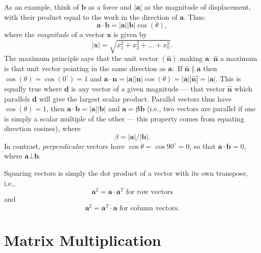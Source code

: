 As an example, think of $\mathbf b$ as a force and $|\mathbf a|$ as the magnitude of displacement, with their product equal to the work in the 
direction of $\mathbf a$. Thus:
\begin{equation}
\mathbf{a \cdot b = |a||b|} \cos (\theta),
\end{equation}	 
where the \emph{magnitude} of a vector $\mathbf x$ is given by
\begin{equation}
|\mathbf{x}| = \sqrt{x^2_1 + x ^2_2 + \ldots + x^2_n}. 
\end{equation}
The maximum principle says that the unit vector $\mathbf{(\hat{n})}$ making $\mathbf{ a \cdot \hat{n}}$ a maximum is that unit vector 
pointing in the same direction as $\mathbf{a}:$ If $\mathbf{\hat{n} \parallel a}$ then $\cos(\theta) = \cos(0^{\circ}) = 1$ and $\mathbf{a\cdot n = |a| |n|}\cos(\theta) =  
\mathbf{|a||\hat{n}| = |a|}$. This is equally true where $\mathbf{d}$ is any vector of a given magnitude --- that vector $\mathbf{\hat{n}}$ which 
parallels $\mathbf{d}$ will give the largest scalar product.
Parallel vectors thus have $\cos(\theta) = 1$, then $\mathbf{a \cdot b = |a||b|}$ and 
$\mathbf{a = \beta b}$ (i.e., two vectors are parallel if 
one is simply a scalar multiple of the other --- this property comes from equating direction cosines), 
where
\begin{equation}
\beta =  \mathbf{|a|/|b|}.
\end{equation}
In contrast, \emph{perpendicular} vectors have $\cos \theta = \cos 90^\circ = 0$, so that $\mathbf{ a \cdot b} = 0$, where $\mathbf{a \bot   b}$.

Squaring vectors is simply the dot product of a vector with its own transpose, i.e.,
\begin{equation}
\mathbf{a}^2 = \mathbf{ a \cdot a}^T \mbox{ for row vectors}
\end{equation}
and
\begin{equation}
\mathbf{a}^2 = \mathbf{ a}^T \cdot \mathbf{a} \mbox{ for column vectors}.
\end{equation}

\section{Matrix Multiplication}

